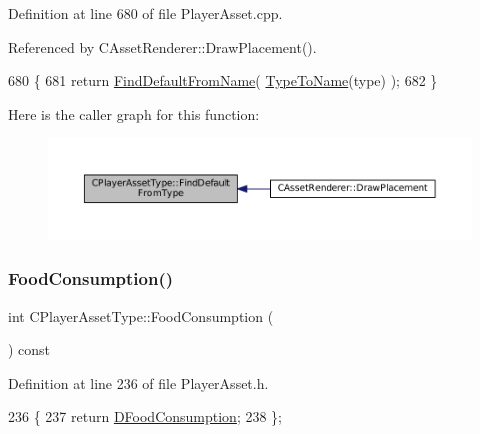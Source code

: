Definition at line 680 of file Player\+Asset.\+cpp.



Referenced by C\+Asset\+Renderer\+::\+Draw\+Placement().


\begin{DoxyCode}
680                                                                                       \{
681     \textcolor{keywordflow}{return} \hyperlink{classCPlayerAssetType_a7e1684eac4efaf7afe9a5c15af262b33}{FindDefaultFromName}( \hyperlink{classCPlayerAssetType_a66ce89c35b74940e9fc947a1f4b9e770}{TypeToName}(type) );
682 \}
\end{DoxyCode}
Here is the caller graph for this function\+:\nopagebreak
\begin{figure}[H]
\begin{center}
\leavevmode
\includegraphics[width=350pt]{classCPlayerAssetType_a7b3c6682f379bfcd974342329eaabab9_icgraph}
\end{center}
\end{figure}
\hypertarget{classCPlayerAssetType_aa42527737b1518ce4d5aa8533bd9bb30}{}\label{classCPlayerAssetType_aa42527737b1518ce4d5aa8533bd9bb30} 
\subsubsection{\texorpdfstring{Food\+Consumption()}{FoodConsumption()}}
{\footnotesize\ttfamily int C\+Player\+Asset\+Type\+::\+Food\+Consumption (\begin{DoxyParamCaption}{ }\end{DoxyParamCaption}) const\hspace{0.3cm}{\ttfamily [inline]}}



Definition at line 236 of file Player\+Asset.\+h.


\begin{DoxyCode}
236                                    \{
237             \textcolor{keywordflow}{return} \hyperlink{classCPlayerAssetType_a8fcab35c2b576476b6f2c80c8b8762fb}{DFoodConsumption};  
238         \};
\end{DoxyCode}
\hypertarget{classCPlayerAssetType_ad8458f72d16825d3c677a75967cf6227}{}\label{classCPlayerAssetType_ad8458f72d16825d3c677a75967cf6227} 
